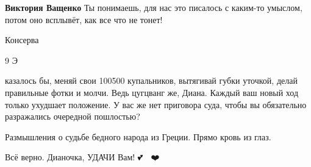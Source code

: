 \begin{itemize}
\begin{itemize}
\textbf{Виктория Ващенко} Ты понимаешь, для нас это писалось с каким-то умыслом, потом оно всплывёт, как все что не тонет!
\end{itemize}

 
Консерва

 
9 Э

 

казалось бы, меняй свои 100500 купальников, вытягивай губки уточкой, делай
правильные фотки и молчи. Ведь цугцванг же, Диана. Каждый ваш новый ход только
ухудшает положение. У вас же нет приговора суда, чтобы вы обязательно
разражались очередной пошлостью?


 
Размышления о судьбе бедного народа из Греции. Прямо кровь из глаз.

 
Всё верно. Дианочка, УДАЧИ Вам! 💕 💞 ❤️

 

\end{itemize}
